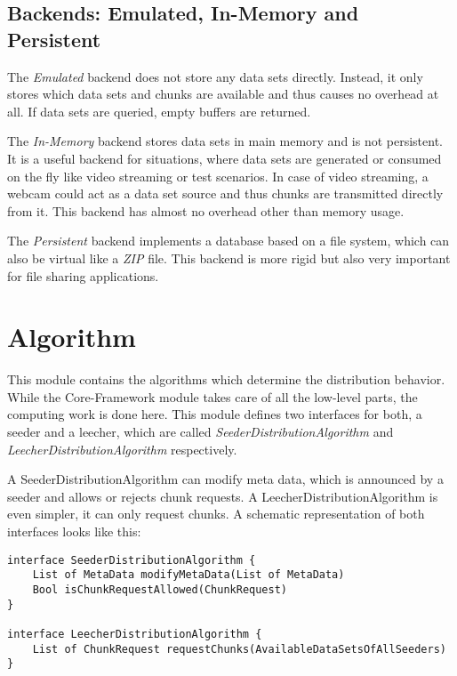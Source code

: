 \subsection{Backends: Emulated, In-Memory and Persistent}
\label{module:database:backend}
The \emph{Emulated} backend does not store any data sets directly. Instead, it only stores which data sets and chunks are available and thus causes no overhead at all. If data sets are queried, empty buffers are returned. 

The \emph{In-Memory} backend stores data sets in main memory and is not persistent. It is a useful backend for situations, where data sets are generated or consumed on the fly like video streaming or test scenarios. In case of video streaming, a webcam could act as a data set source and thus chunks are transmitted directly from it. This backend has almost no overhead other than memory usage. 

The \emph{Persistent} backend implements a database based on a file system, which can also be virtual like a \emph{ZIP} file. This backend is more rigid but also very important for file sharing applications.



\section{Algorithm}
\label{module:algorithm}
This module contains the algorithms which determine the distribution behavior. While the Core-Framework module takes care of all the low-level parts, the computing work is done here. This module defines two interfaces for both, a seeder and a leecher, which are called \emph{SeederDistributionAlgorithm} and \emph{LeecherDistributionAlgorithm} respectively. 

A SeederDistributionAlgorithm can modify meta data, which is announced by a seeder and allows or rejects chunk requests. A LeecherDistributionAlgorithm is even simpler, it can only request chunks. A schematic representation of both interfaces looks like this:

\begin{verbatim}
interface SeederDistributionAlgorithm {
    List of MetaData modifyMetaData(List of MetaData)
    Bool isChunkRequestAllowed(ChunkRequest)
}

interface LeecherDistributionAlgorithm {
    List of ChunkRequest requestChunks(AvailableDataSetsOfAllSeeders)
}
\end{verbatim}


\pagebreak

